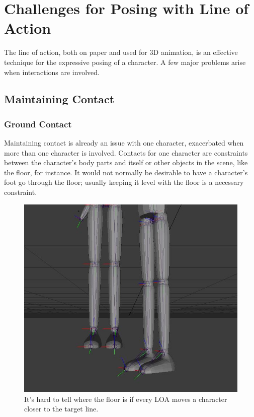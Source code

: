 \chapter{Challenges for Posing with Line of Action}\label{chap:issues}
The line of action, both on paper and used for 3D animation, is an effective technique for the expressive posing of a character. A few major problems arise when interactions are involved.

\section{Maintaining Contact}
\subsection{Ground Contact}
Maintaining contact is already an issue with one character, exacerbated when more than one character is involved. Contacts for one character are constraints between the character's body parts and itself or other objects in the scene, like the floor, for instance. It would not normally be desirable to have a character's foot go through the floor; usually keeping it level with the floor is a necessary constraint.

\begin{figure}[!h]
\centering
\includegraphics[scale=0.5]{img/constraint}
\caption{It's hard to tell where the floor is if every LOA moves a character closer to the target line.}
\end{figure}


